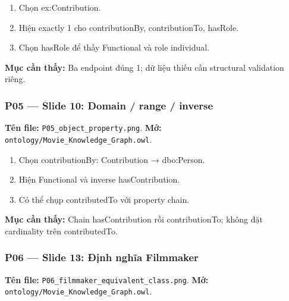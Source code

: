 \documentclass[
  11pt,
]{article}
\providecommand{\tightlist}{%
  \setlength{\itemsep}{0pt}\setlength{\parskip}{0pt}}
\begin{document}
\begin{enumerate}
\def\labelenumi{\arabic{enumi}.}
\tightlist
\item
  Chọn
  ex:\allowbreak{}\allowbreak{}Contr\allowbreak{}ibution.\allowbreak{}
\item
  Hiện exactly 1 cho contribu\allowbreak{}tion\allowbreak{}By,
  contribu\allowbreak{}tion\allowbreak{}To, hasRole.
\item
  Chọn hasRole để thấy Functional và role individual.
\end{enumerate}

\textbf{Mục cần thấy:} Ba endpoint đúng 1; dữ liệu thiếu cần structural
validation riêng.

\subsubsection{P05 --- Slide 10: Domain / range /
inverse}\label{p05-slide-10-domain-range-inverse}

\textbf{Tên file:}
\texttt{P05\_\allowbreak{}obje\allowbreak{}ct\_\allowbreak{}prope\allowbreak{}rty.\allowbreak{}png}.
\textbf{Mở:}
\texttt{ontology\allowbreak{}/\allowbreak{}\allowbreak{}Movie\_\allowbreak{}\allowbreak{}K\allowbreak{}nowledge\allowbreak{}\_\allowbreak{}\allowbreak{}Graph.\allowbreak{}o\allowbreak{}wl}.

\begin{enumerate}
\def\labelenumi{\arabic{enumi}.}
\tightlist
\item
  Chọn contribu\allowbreak{}tion\allowbreak{}By:\allowbreak{}
  Contribution → dbo:Person.
\item
  Hiện Functional và inverse
  has\allowbreak{}Contr\allowbreak{}ibution.\allowbreak{}
\item
  Có thể chụp contribu\allowbreak{}ted\allowbreak{}To với property
  chain.
\end{enumerate}

\textbf{Mục cần thấy:} Chain has\allowbreak{}Contr\allowbreak{}ibution
rồi contribu\allowbreak{}tion\allowbreak{}To; không đặt cardinality trên
contribu\allowbreak{}ted\allowbreak{}To.\allowbreak{}

\subsubsection{P06 --- Slide 13: Định nghĩa
Filmmaker}\label{p06-slide-13-ux111ux1ecbnh-nghux129a-filmmaker}

\textbf{Tên file:}
\texttt{P06\_\allowbreak{}film\allowbreak{}maker\_\allowbreak{}eq\allowbreak{}uivalent\allowbreak{}\_\allowbreak{}class.\allowbreak{}p\allowbreak{}ng}.
\textbf{Mở:}
\texttt{ontology\allowbreak{}/\allowbreak{}\allowbreak{}Movie\_\allowbreak{}\allowbreak{}K\allowbreak{}nowledge\allowbreak{}\_\allowbreak{}\allowbreak{}Graph.\allowbreak{}o\allowbreak{}wl}.
\end{document}
